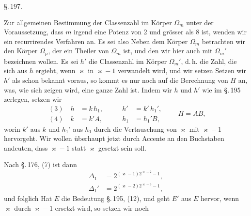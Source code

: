 

\begin{center}
\S.\,197.

\end{center}

Zur allgemeinen Bestimmung der Classenzahl im K\"orper $\Omega_m$ unter
der Voraussetzung, dass $m$ irgend eine Potenz von 2 und gr\"osser als 8
ist, wenden wir ein recurrirendes Verfahren an. Es sei also
Neben dem K\"orper $\Omega_m$ betrachten wir den K\"orper $\Omega_\mu$,
der ein Theiler von $\Omega_m$ ist, und den wir hier auch mit $\Omega_m'$
bezeichnen wollen. Es sei $h'$ die Classenzahl im K\"orper $\Omega_m'$,
d.\,h. die Zahl, die sich aus $h$ ergiebt, wenn $\varkappa$ in
$\varkappa - 1$ verwandelt wird, und wir setzen
Setzen wir $h'$ als schon bekannt voraus, so kommt es nur noch auf die
Berechnung von $H$ an, was, wie sich zeigen wird, eine ganze Zahl ist.
Indem wir $h$ und $h'$ wie im \S.\,195 zerlegen, setzen wir
\[
\begin{aligned}
(3)\quad h &= k\,h_1, & \qquad h' &= k'\,h_1', \\
(4)\quad k &= k'A, & \qquad h_1 &= h_1'B,
\end{aligned}
\qquad H = AB,
\]
worin $k'$ aus $k$ und $h_1'$ aus $h_1$ durch die Vertauschung von
$\varkappa$ mit $\varkappa - 1$ hervorgeht. Wir wollen \"uberhaupt jetzt
durch Accente an den Buchstaben andeuten, dass $\varkappa - 1$ statt
$\varkappa$ gesetzt sein soll.

Nach \S.\,176, (7) ist dann
\[
\begin{aligned}
\Delta_1 &= 2^{(\varkappa-1)2^{\varkappa-2}-1}, \\
\Delta_1' &= 2^{(\varkappa-2)2^{\varkappa-3}-1},
\end{aligned}
\]
und folglich
Hat $E$ die Bedeutung \S.\,195, (12), und geht $E'$ aus $E$ hervor, wenn
$\varkappa$ durch $\varkappa - 1$ ersetzt wird, so setzen wir noch
